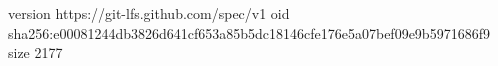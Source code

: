 version https://git-lfs.github.com/spec/v1
oid sha256:e00081244db3826d641cf653a85b5dc18146cfe176e5a07bef09e9b5971686f9
size 2177
